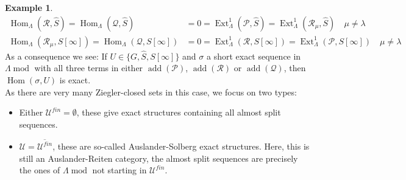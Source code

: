 \documentclass[11pt,a4paper]{amsart}
\theoremstyle{plain}
\theoremstyle{definition}
\newtheorem{exa}[thm]{Example}
\DeclareMathOperator{\Hom}{Hom}
\DeclareMathOperator{\Ext}{Ext}
\DeclareMathOperator{\modu}{mod}
\newcommand{\La}{\Lambda}
\newcommand{\mcP}{\mathcal{P}}
\newcommand{\mcQ}{\mathcal{Q}}
\newcommand{\mcR}{\mathcal{R}}
\newcommand{\mcU}{\mathcal{U}}
\DeclareMathOperator{\add}{add}
\begin{document}
\begin{exa}
\[\begin{aligned}
\Hom_{\La} (\mcR, \hat{S}) =\Hom_{\La}(\mcQ, \hat{S}) &=0=\Ext^1_{\La} (\mcP, \hat{S})= \Ext^1_{\La} (\mcR_{\mu}, \hat{S}) \quad \mu \neq \lambda \\ 
\Hom_{\La}(\mcR_{\mu}, S[\infty])=\Hom_{\La}(\mcQ, S[\infty]) &=0 = \Ext^1_{\La}(\mcR ,S[\infty])=\Ext^1_{\La} (\mcP, S[\infty]) \quad \mu \neq \lambda 
\end{aligned}
\]
As a consequence we see: 
If $U\in \{G, \hat{S}, S[\infty]\}$ and $\sigma$ a short exact sequence in $\La\modu$ with all three terms in either $\add(\mcP)$, $\add(\mcR)$ or $\add(\mcQ)$, then $\Hom (\sigma , U)$ is exact. \\
As there are very many Ziegler-closed sets in this case, we focus on two types: 
\begin{itemize}
\item[(I)] Either $\mcU^{fin}=\emptyset$, these give exact structures containing all almost split sequences.
\item[(II)] $\mcU=\overline{\mcU^{fin}}$, these are so-called Auslander-Solberg exact structures. Here, this is still an Auslander-Reiten category, the almost split sequences are precisely the ones of $\La\modu$ not starting in $\mcU^{fin}$. 
\end{itemize}




\end{exa}
\end{document}
